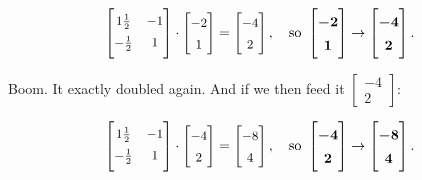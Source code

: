\vspace{-.2in}
\begin{align*}
\renewcommand*{\arraystretch}{1.4}
\small
\begin{bmatrix}
1\frac{1}{2} & -1 \\
\smallskip
-\frac{1}{2} & 1 \\
\end{bmatrix} \cdot
\begin{bmatrix}
-2 \\ 1 \\
\end{bmatrix} =
\begin{bmatrix}
-4 \\ 2 \\
\end{bmatrix}, \normalsize \quad \textrm{so}\
\boldmath
\begin{bmatrix}
-2 \\ 1 \\
\end{bmatrix} \rightarrow
\begin{bmatrix}
-4 \\ 2 \\
\end{bmatrix}.
\unboldmath
\end{align*}

Boom. It exactly doubled again. And if we then feed it {\footnotesize
$\begin{bmatrix} -4 \\ 2 \end{bmatrix}$}:

\vspace{-.2in}
\begin{align*}
\renewcommand*{\arraystretch}{1.4}
\small
\begin{bmatrix}
1\frac{1}{2} & -1 \\
\smallskip
-\frac{1}{2} & 1 \\
\end{bmatrix} \cdot
\begin{bmatrix}
-4 \\ 2 \\
\end{bmatrix} =
\begin{bmatrix}
-8 \\ 4 \\
\end{bmatrix}, \normalsize \quad \textrm{so}\
\boldmath
\begin{bmatrix}
-4 \\ 2 \\
\end{bmatrix} \rightarrow
\begin{bmatrix}
-8 \\ 4 \\
\end{bmatrix}.
\unboldmath
\end{align*}

